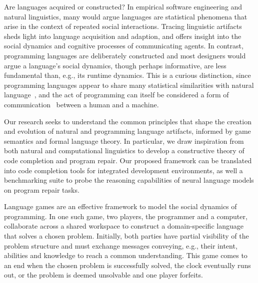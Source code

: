 \documentclass[sigplan,screen]{acmart}
\begin{document}

Are languages acquired or constructed? In empirical software engineering and natural linguistics, many would argue languages are statistical phenomena that arise in the context of repeated social interactions. Tracing linguistic artifacts sheds light into language acquisition and adaption, and offers insight into the social dynamics and cognitive processes of communicating agents. In contrast, programming languages are deliberately constructed and most designers would argue a language's social dynamics, though perhaps informative, are less fundamental than, e.g., its runtime dynamics. This is a curious distinction, since programming languages appear to share many statistical similarities with natural language~\cite{hindle2016naturalness}, and the act of programming can itself be considered a form of communication~\cite{demillo1979social} between a human and a machine.

Our research seeks to understand the common principles that shape the creation and evolution of natural and programming language artifacts, informed by game semantics and formal language theory. In particular, we draw inspiration from both natural and computational linguistics to develop a constructive theory of code completion and program repair. Our proposed framework can be translated into code completion tools for integrated development environments, as well a benchmarking suite to probe the reasoning capabilities of neural language models on program repair tasks.

Language games are an effective framework to model the social dynamics of programming. In one such game, two players, the programmer and a computer, collaborate across a shared workspace to construct a domain-specific language that solves a chosen problem. Initially, both parties have partial visibility of the problem structure and must exchange messages conveying, e.g., their intent, abilities and knowledge to reach a common understanding. This game comes to an end when the chosen problem is successfully solved, the clock eventually runs out, or the problem is deemed unsolvable and one player forfeits.
\end{document}
